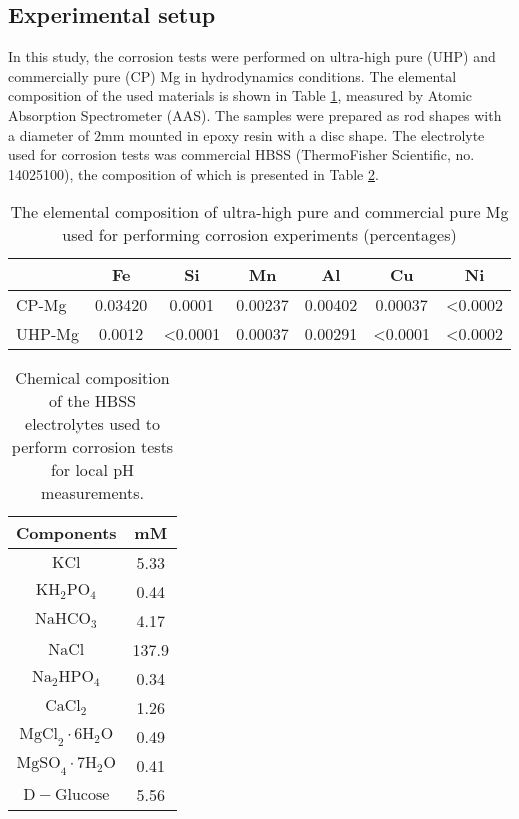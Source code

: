 \subsection{Experimental setup}


In this study, the corrosion tests were performed on ultra-high pure (\gls{UHP}) and commercially pure (\gls{CP}) Mg in hydrodynamics conditions. The elemental composition of the used materials is shown in Table \ref{tab:kinetics_alloys_composition}, measured by Atomic Absorption Spectrometer (AAS). The samples were prepared as rod shapes with a diameter of $2\text{mm}$ mounted in epoxy resin with a disc shape. The electrolyte used for corrosion tests was commercial \gls{HBSS} (ThermoFisher Scientific, no. 14025100), the composition of which is presented in Table \ref{tab:kinetics_electrolyte_composition}.


\begin{table}[t]
\caption[The elemental composition of highly-pure and commercial-pure Mg]{The elemental composition of ultra-high pure and commercial pure Mg used for performing corrosion experiments (percentages)}
\medskip
\centering
\begin{tabular}{lcccccc}
\hline & {Fe} & {Si} & {Mn} & {Al} & {Cu} & {Ni} \\
\hline { \gls{CP}-Mg } & 0.03420 & 0.0001 & 0.00237 & 0.00402 & 0.00037 & <0.0002  \\
{ \gls{UHP}-Mg } & 0.0012 & <0.0001 & 0.00037 & 0.00291 & <0.0001 & <0.0002
\end{tabular}
\label{tab:kinetics_alloys_composition}
\end{table}

\begin{table}[h]
\caption[Chemical composition of the HBSS electrolyte]{Chemical composition of the \gls{HBSS} electrolytes used to perform corrosion tests for local pH measurements.}
\medskip
\centering
\begin{tabular}{cc}
\hline
{Components} & {mM} \\
\hline
$\mathrm{KCl}$ & 5.33 \\
$\mathrm{KH}_{2} \mathrm{PO}_{4}$ & 0.44 \\
$\mathrm{NaHCO}_{3}$ & 4.17 \\
$\mathrm{NaCl}$ & 137.9 \\
$\mathrm{Na}_{2} \mathrm{HPO}_{4}$ & 0.34 \\
$\mathrm{CaCl}_{2}$ & 1.26 \\
$\mathrm{MgCl}_{2} \cdot 6 \mathrm{H}_{2} \mathrm{O}$ & 0.49 \\
$\mathrm{MgSO}_{4} \cdot 7 \mathrm{H}_{2} \mathrm{O}$ & 0.41 \\
$\mathrm{D}-\mathrm{Glucose}$ & 5.56 \\
\hline

\end{tabular}
\label{tab:kinetics_electrolyte_composition}
\end{table}

